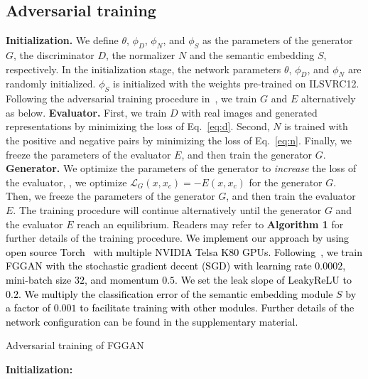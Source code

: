 \documentclass[runningheads]{llncs}
\begin{document}
\subsection{Adversarial training}{\flushleft \textbf{Initialization.}} We define $\theta$, $\phi_D$, $\phi_N$, and $\phi_S$ as the parameters of the generator $G$, the discriminator $D$, the normalizer $N$ and the semantic embedding $S$, respectively. In the initialization stage, the network parameters $\theta$, $\phi_D$, and $\phi_N$ are randomly initialized. $\phi_S$ is initialized with the weights pre-trained on ILSVRC12. Following the adversarial training procedure in~\cite{goodfellow2014generative}, we train $G$ and $E$ alternatively as below. 
{\flushleft \textbf{Evaluator.}} First, we train $D$ with real images and generated representations by minimizing the loss of Eq.~\eqref{eq:d}. Second, $N$ is trained with the positive and negative pairs by minimizing the loss of Eq.~\eqref{eq:n}. 
Finally, we freeze the parameters of the evaluator $E$, and then train the generator $G$.
{\flushleft \textbf{Generator.}} We optimize the parameters of the generator to \textit{increase} the loss of the evaluator, \ie, we optimize $\mathcal{L}_G(x,x_c) = -E(x, x_c)$ for the generator $G$.
Then, we freeze the parameters of the generator $G$, and then train the evaluator $E$. The training procedure will continue alternatively until the generator $G$ and the evaluator $E$ reach an equilibrium. Readers may refer to \textbf{Algorithm 1} for further details of the training procedure. 
\textcolor{black}{We implement our approach by using open source Torch~\cite{collobert:2011c} with multiple NVIDIA Telsa K80 GPUs. Following~\cite{radford2015unsupervised}, we train FGGAN with the stochastic gradient decent (SGD) with learning rate $0.0002$, mini-batch size $32$, and momentum $0.5$. We set the leak slope of LeakyReLU to $0.2$.
We multiply the classification error of the semantic embedding module $S$ by a factor of $0.001$ to facilitate training with other modules.
Further details of the network configuration can be found in the supplementary material.}%
   \label{agl:algo}
  \caption{Adversarial training of FGGAN}
  \textbf{Initialization:} 
\end{document}
